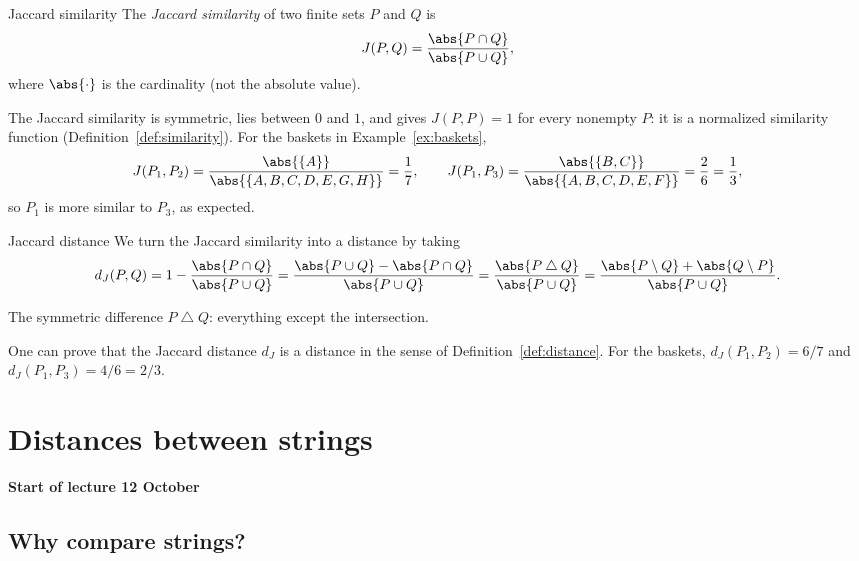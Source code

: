 \documentclass[a4paper,12pt,oneside]{report}
\newcommand{\lecturebanner}[1]{%
  \Needspace{6\baselineskip}%
  \begin{tcolorbox}[colback=yellow!20,colframe=yellow!60!black,
    boxrule=0.4pt,arc=1mm,left=5pt,right=5pt,top=3pt,bottom=3pt,
    before skip=6pt,after skip=6pt]
  \small\textbf{#1}
  \end{tcolorbox}}
\newcommand{\lecturestart}[1]{\lecturebanner{Start of lecture #1}}
\begin{document}
\begin{frameddefn}{Jaccard similarity}\label{def:jaccard}
The \emph{Jaccard similarity} of two finite sets $P$ and $Q$ is
\[
  J(P,Q)=\frac{\abs{P\cap Q}}{\abs{P\cup Q}},
\]
where $\abs{\cdot}$ is the cardinality (not the absolute value).
\end{frameddefn}

The Jaccard similarity is symmetric, lies between $0$ and $1$, and
gives $J(P,P)=1$ for every nonempty $P$: it is a normalized similarity
function (Definition~\ref{def:similarity}). For the baskets in
Example~\ref{ex:baskets},
\[
  J(P_1,P_2)=\frac{\abs{\{A\}}}{\abs{\{A,B,C,D,E,G,H\}}}=\frac17,
  \qquad
  J(P_1,P_3)=\frac{\abs{\{B,C\}}}{\abs{\{A,B,C,D,E,F\}}}=\frac26=\frac13,
\]
so $P_1$ is more similar to $P_3$, as expected.

\begin{frameddefn}{Jaccard distance}\label{def:jaccard-distance}
We turn the Jaccard similarity into a distance by taking
\[
  d_J(P,Q)=1-\frac{\abs{P\cap Q}}{\abs{P\cup Q}}
          =\frac{\abs{P\cup Q}-\abs{P\cap Q}}{\abs{P\cup Q}}
          =\frac{\abs{P\mathbin{\triangle}Q}}{\abs{P\cup Q}}
          =\frac{\abs{P\setminus Q}+\abs{Q\setminus P}}{\abs{P\cup Q}}.
\]
\end{frameddefn}

\begin{center}

{\small The symmetric difference $P\mathbin{\triangle}Q$: everything
except the intersection.}
\end{center}

One can prove that the Jaccard distance $d_J$ is a distance in the
sense of Definition~\ref{def:distance}. For the baskets,
$d_J(P_1,P_2)=6/7$ and $d_J(P_1,P_3)=4/6=2/3$.

\chapter{Distances between strings}

\lecturestart{12 October}

\section{Why compare strings?}
\end{document}
